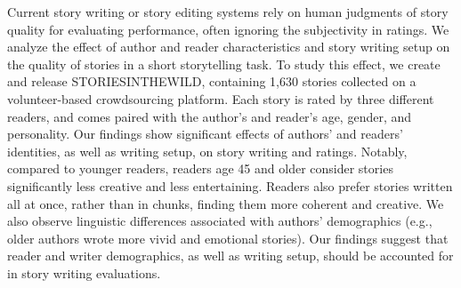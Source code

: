 Current story writing or story editing systems rely on human judgments of story quality for evaluating performance, often ignoring the subjectivity in ratings. We analyze the effect of author and reader characteristics and story writing setup on the quality of stories in a short storytelling task. To study this effect, we create and release STORIESINTHEWILD, containing 1,630 stories collected on a volunteer-based crowdsourcing platform. Each story is rated by three different readers, and comes paired with the author's and reader's age, gender, and personality. Our findings show significant effects of authors' and readers' identities, as well as writing setup, on story writing and ratings. Notably, compared to younger readers, readers age 45 and older consider stories significantly less creative and less entertaining. Readers also prefer stories written all at once, rather than in chunks, finding them more coherent and creative. We also observe linguistic differences associated with authors' demographics (e.g., older authors wrote more vivid and emotional stories).  Our findings suggest that reader and writer demographics, as well as writing setup, should be accounted for in story writing evaluations.
